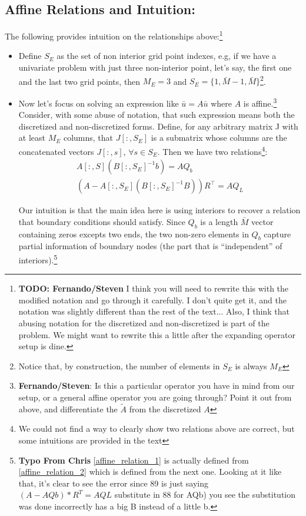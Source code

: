 \documentclass[11pt]{article}
\begin{document}
		\subsection{Affine Relations and Intuition:}
		The following provides intuition on the relationships above:\footnote{\textbf{TODO: Fernando/Steven} I think you will need to rewrite this with the modified notation and go through it carefully.  I don't quite get it, and the notation was slightly different than the rest of the text...  Also, I think that abusing notation for the discretized and non-discretized is part of the problem.  We might want to rewrite this a little after the expanding operator setup is dine.}
		\begin{itemize}
		\item Define $S_E$ as the set of non interior grid point indexes, e.g, if we have a univariate problem with just three non-interior point, let's say, the first one and the last two grid points, then $M_E = 3$ and $S_E = \{1,\bar{M}-1,\bar{M}\}$\footnote{Notice that, by construction, the number of elements in $S_E$ is always $M_E$}.
			\item Now let's focus on solving an expression like $\bar{u} = A \bar{u}$ where $A$ is affine.\footnote{\textbf{Fernando/Steven}: Is this a particular operator you have in mind from our setup, or a general affine operator you are going through?  Point it out from above, and differentiate the $\tilde{A}$ from the discretized $A$} Consider, with some abuse of notation, that such expression means both the discretized and non-discretized forms. Define, for any arbitrary matrix J with at least $M_E$ columns, that $J[:,S_E]$ is a submatrix whose columns are the concatenated vectors $J[:,s]$, $\forall s \in S_E$.
			Then we have two relations\footnote{We could not find a way to clearly show two relations above are correct, but some intuitions are provided in the text}:
			\begin{align}
			A [:,S] \left(B[:,S_E]^{-1} b \right) = A  Q_b\label{affine_relation_1}\\
			(A -A [:,S_E] (B[:,S_E]^{-1} B)) R^{\top} = A  Q_L\label{affine_relation_2}
			\end{align}

			Our intuition is that the main idea here is using interiors to recover a relation that boundary conditions should satisfy. Since $Q_b$ is a length $\bar{M}$ vector containing zeros excepts two ends, the two non-zero elements in $Q_b$ capture partial information of boundary nodes (the part that is ``independent'' of interiors).\footnote{\textbf{Typo From Chris}
				\cref{affine_relation_1} is actually defined from \cref{affine_relation_2} which is defined from the next one.  Looking at it like that, it's clear to see the error
				since 89 is just saying
				$(A - AQb)*R^T = AQL$
				substitute in 88 for AQb)
				you see the substitution was done incorrectly
				has a big B instead of a little b.
			}
			

\end{itemize}
\end{document}
